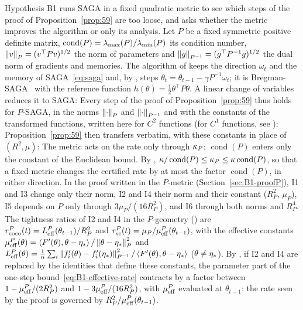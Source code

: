 Hypothesis B1 runs SAGA in a fixed quadratic metric to see which steps of the proof of Proposition~\ref{prop:59} are
too loose, and asks whether the metric improves the algorithm or only its analysis. Let $P$ be a fixed symmetric
positive definite matrix, $\operatorname{cond}(P)=\lambda_{\max}(P)/\lambda_{\min}(P)$ its condition number, $\left\|v\right\|_P=(v^\top Pv)^{1/2}$
the norm of parameters and $\left\|g\right\|_{P^{-1}}=(g^\top P^{-1}g)^{1/2}$ the dual norm of gradients and memories. The
algorithm of  keeps the direction $\omega_t$ and the memory of SAGA~\eqref{eq:saga} and, by
, steps $\theta_t=\theta_{t-1}-\gamma P^{-1}\omega_t$; it is Bregman-SAGA~\cite{dragomir2021fast}
with the reference function $h(\theta)=\frac12\theta^\top P\theta$. A linear change of variables reduces it to SAGA:
Every step of the proof of Proposition~\ref{prop:59} thus holds for $P$-SAGA, in the norms $\left\|\cdot\right\|_P$ and
$\left\|\cdot\right\|_{P^{-1}}$ and with the constants of the transformed functions, written here for $C^2$ functions (for
$C^1$ functions, see ):
Proposition~\ref{prop:59} then transfers verbatim, with these constants in place of $(R^2,\mu)$:
The metric acts on the rate only through $\kappa_P$; $\operatorname{cond}(P)$ enters only the constant of the Euclidean
bound. By , $\kappa/\operatorname{cond}(P)\le\kappa_P\le\kappa\operatorname{cond}(P)$, so that a
fixed metric changes the certified rate by at most the factor $\operatorname{cond}(P)$, in either direction. In the
proof written in the $P$-metric (Section~\ref{sec:B1-proofP}), I1 and I3 change only their norm, I2 and I4 their norm
and their constant ($R_P^2$, $\mu_P$), I5 depends on $P$ only through $3\mu_P/(16R_P^2)$, and I6 through both norms and
$R_P^4$. The tightness ratios of I2 and I4 in the $P$-geometry () are
$r^P_{\rm coco}(t)=L_{\mathrm{eff}}^P(\theta_{t-1})/R_P^2$ and $r^P_{\rm sc}(t)=\mu_P/\mu_{\mathrm{eff}}^P(\theta_{t-1})$, with the effective
constants $\mu_{\mathrm{eff}}^P(\theta)=\left\langle F'(\theta), \theta-\eta_\ast \right\rangle/\left\|\theta-\eta_\ast\right\|_P^2$ and
$L_{\mathrm{eff}}^P(\theta)=\frac1n\sum_i\left\|f'_i(\theta)-f'_i(\eta_\ast)\right\|_{P^{-1}}^2/\left\langle F'(\theta), \theta-\eta_\ast \right\rangle$
($\theta\ne\eta_\ast$). By , if I2 and I4 are replaced by the identities that define these
constants, the parameter part of the one-step bound~\eqref{eq:B1-effective-rate} contracts by a factor between
$1-\mu_{\mathrm{eff}}^P/(2R_P^2)$ and $1-3\mu_{\mathrm{eff}}^P/(16R_P^2)$, with $\mu_{\mathrm{eff}}^P$ evaluated at $\theta_{t-1}$: the rate seen by the
proof is governed by $R_P^2/\mu_{\mathrm{eff}}^P(\theta_{t-1})$.

